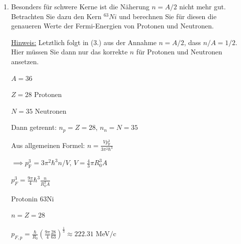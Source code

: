 \documentclass[11pt,a4paper]{scrartcl}
\begin{document}
\begin{enumerate}
                \begin{calculationbox}
                    Gesucht is die mittlere kinetische Energie aller besetzten Zustände von $p = 0$ bis $p= p_\text{F}$. 

                    $T = \frac{p^2}{2m}$

                    Im impulsraum ist die Zustandsdichte proportional zu $p^2 dp$

                    Also: mittlere energie $= \frac{\int\limits_0^{p_\text{F}} T(p) p^2 dp}{\int\limits_0^{p_\text{F}} p^2 dp} = \frac{1}{2m} \frac{\int p^4 dp}{\int p^2 dp}$

                    mittlere Energie $= \frac{1}{2m} \frac{3}{f} p_\text{F}^2 = \frac{3}{5} E_\text{F}$
                \end{calculationbox}

            \item
                Besonders für schwere Kerne ist die Näherung $n = A/2$ nicht mehr gut. Betrachten Sie dazu den Kern ${}^{63}Ni$ und berechnen Sie für diesen die genaueren Werte der Fermi-Energien von Protonen und Neutronen.

                \underline{Hinweis:} Letztlich folgt in (3.) aus der Annahme $n = A/2$, dass $n/A = 1/2$. Hier müssen Sie dann nur das korrekte $n$ für Protonen und Neutronen ansetzen.

                \begin{calculationbox}
                    $A=36$

                    $Z = 28$ Protonen

                    $N = 35$ Neutronen

                    Dann getrennt: $n_p = Z = 28$, $n_n = N = 35$

                    Aus allgemeinen Formel: $n = \frac{V p_\text{F}^3}{3 \pi^2 \hbar^3}$

                    $\implies p_\text{F}^3 = 3 \pi^2 \hbar^3 n / V$, $V= \frac{4}{3} \pi R_0^3 A$

                    $p_F^3 = \frac{9\pi}{4} \hbar^3 \frac{n}{R_0^3 A} $

                    Protonin 63Ni

                    \begin{calculationbox}
                        $n = Z = 28$

                        $p_{F,p} = \frac{\hbar}{R_0} (\frac{9\pi}{4} \frac{28}{63})^\frac{1}{3} \approx 222.31$ MeV$/$c


\end{calculationbox}
\end{calculationbox}
\end{enumerate}
\end{document}

